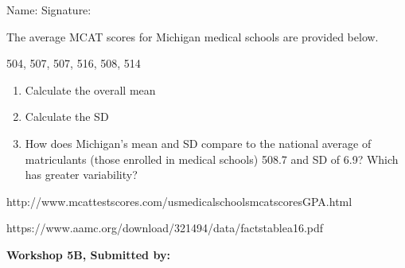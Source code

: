 \documentclass[11pt, chapterprefix=true]{scrbook}\usepackage[]{graphicx}\usepackage[]{color}
\begin{document}
\begin{exercises}
\begin{exercise}
\begin{center}
{{\vspace{4mm}
Name: \underline{\phantom{xxxxxxxxxxxxxxxxxxxxxxxx}} Signature: \underline{\phantom{xxxxxxxxxxxxxxxxxxxxxxxx}}
 }}
\end{center}

The average MCAT scores for Michigan medical schools are provided below.

504, 507, 507, 516, 508, 514

\begin{enumerate}
  \item Calculate the overall mean
  \item Calculate the SD
  \item How does Michigan's mean and SD compare to the national average of matriculants (those enrolled in medical schools) 508.7 and SD of 6.9?  Which has greater variability?
\end{enumerate}

http://www.mcattestscores.com/usmedicalschoolsmcatscoresGPA.html

https://www.aamc.org/download/321494/data/factstablea16.pdf

\end{exercise} 
\begin{solution}  %

\end{solution}

\clearpage

    \begin{exercise}  %

    \begin{center}
\begin{flushleft}\textbf{\large \hfill Workshop 5B, Submitted by: }\end{flushleft}

\end{center}


\end{exercise}
\end{exercises}
\end{document}
